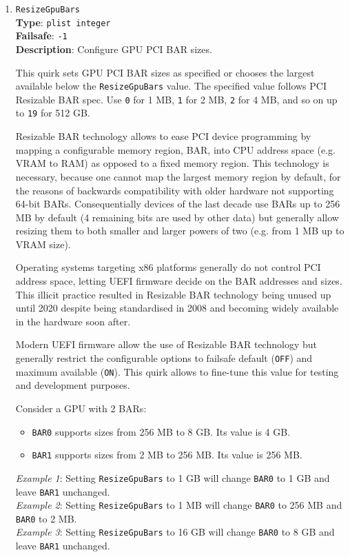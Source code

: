 \documentclass[]{article}
\providecommand{\tightlist}{%
  \setlength{\itemsep}{0pt}\setlength{\parskip}{0pt}}
\begin{document}
\begin{enumerate}
\item
  \texttt{ResizeGpuBars}\\
  \textbf{Type}: \texttt{plist\ integer}\\
  \textbf{Failsafe}: \texttt{-1}\\
  \textbf{Description}: Configure GPU PCI BAR sizes.

  This quirk sets GPU PCI BAR sizes as specified or chooses
  the largest available below the \texttt{ResizeGpuBars} value.
  The specified value follows PCI Resizable BAR spec.
  Use \texttt{0} for 1 MB, \texttt{1} for 2 MB, \texttt{2}
  for 4 MB, and so on up to \texttt{19} for 512 GB.

  Resizable BAR technology allows to ease PCI device programming by mapping
  a configurable memory region, BAR, into CPU address space (e.g. VRAM to RAM)
  as opposed to a fixed memory region. This technology is necessary, because
  one cannot map the largest memory region by default, for the reasons of backwards
  compatibility with older hardware not supporting 64-bit BARs. Consequentially
  devices of the last decade use BARs up to 256 MB by default (4 remaining bits are used
  by other data) but generally allow resizing them to both smaller and larger
  powers of two (e.g. from 1 MB up to VRAM size).

  Operating systems targeting x86 platforms generally do not control PCI address space,
  letting UEFI firmware decide on the BAR addresses and sizes. This illicit practice
  resulted in Resizable BAR technology being unused up until 2020 despite being
  standardised in 2008 and becoming widely available in the hardware soon after.

  Modern UEFI firmware allow the use of Resizable BAR technology but generally
  restrict the configurable options to failsafe default (\texttt{OFF})
  and maximum available (\texttt{ON}). This quirk allows to fine-tune this
  value for testing and development purposes.

  Consider a GPU with 2 BARs:
  \begin{itemize}
    \tightlist
    \item \texttt{BAR0} supports sizes from 256 MB to 8 GB. Its value is 4 GB.
    \item \texttt{BAR1} supports sizes from 2 MB to 256 MB. Its value is 256 MB.
  \end{itemize}

  \emph{Example 1}: Setting \texttt{ResizeGpuBars} to 1 GB will change
  \texttt{BAR0} to 1 GB and leave \texttt{BAR1} unchanged.
  \\
  \emph{Example 2}: Setting \texttt{ResizeGpuBars} to 1 MB will change
  \texttt{BAR0} to 256 MB and \texttt{BAR0} to 2 MB.
  \\
  \emph{Example 3}: Setting \texttt{ResizeGpuBars} to 16 GB will change
  \texttt{BAR0} to 8 GB and leave \texttt{BAR1} unchanged.


\end{enumerate}
\end{document}
